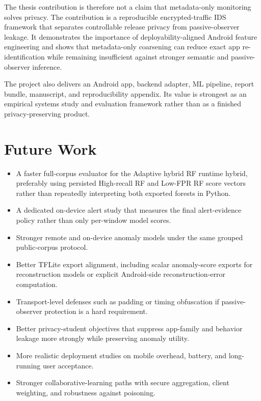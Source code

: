 The thesis contribution is therefore not a claim that metadata-only monitoring solves privacy. The
contribution is a reproducible encrypted-traffic IDS framework that separates controllable release
privacy from passive-observer leakage. It demonstrates the importance of deployability-aligned
Android feature engineering and shows that metadata-only coarsening can reduce exact app
re-identification while remaining insufficient against stronger semantic and passive-observer
inference.

The project also delivers an Android app, backend adapter, ML pipeline, report bundle,
manuscript, and reproducibility appendix. Its value is strongest as an empirical systems study and
evaluation framework rather than as a finished privacy-preserving product.

\section{Future Work}
\begin{itemize}[leftmargin=*]
  \item A faster full-corpus evaluator for the Adaptive hybrid RF runtime hybrid, preferably using
  persisted High-recall RF and Low-FPR RF score vectors rather than repeatedly interpreting both
  exported forests in Python.
  \item A dedicated on-device alert study that measures the final alert-evidence policy rather than
  only per-window model scores.
  \item Stronger remote and on-device anomaly models under the same grouped public-corpus protocol.
  \item Better TFLite export alignment, including scalar anomaly-score exports for reconstruction
  models or explicit Android-side reconstruction-error computation.
  \item Transport-level defenses such as padding or timing obfuscation if passive-observer
  protection is a hard requirement.
  \item Better privacy-student objectives that suppress app-family and behavior leakage more
  strongly while preserving anomaly utility.
  \item More realistic deployment studies on mobile overhead, battery, and long-running user
  acceptance.
  \item Stronger collaborative-learning paths with secure aggregation, client weighting, and
  robustness against poisoning.
\end{itemize}
